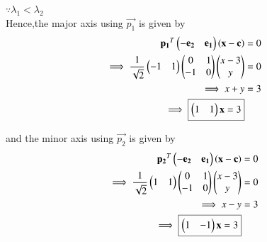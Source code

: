 \begin{enumerate}
    $\because \lambda_1<\lambda_2$ \\
    Hence,the major axis using $\vec{p_1}$ is given by
    \begin{align}
        \mathbf{p_1}^T\begin{pmatrix}-\mathbf{e_2} & \mathbf{e_1}\end{pmatrix}\left(\mathbf{x}-\mathbf{c}\right) &= 0 \\
        \implies \frac{1}{\sqrt{2}}\begin{pmatrix}-1 & 1\end{pmatrix}\begin{pmatrix}0 & 1 \\ -1 & 0\end{pmatrix}\begin{pmatrix}x-3 \\ y\end{pmatrix} &= 0 \\
        \implies x+y &= 3 \\
        \implies \boxed{\begin{pmatrix}1 & 1\end{pmatrix}\mathbf{x} =3}
    \end{align}
    
    and the minor axis using $\vec{p_2}$ is given by
    \begin{align}
        \mathbf{p_2}^T\begin{pmatrix}-\mathbf{e_2} & \mathbf{e_1}\end{pmatrix}\left(\mathbf{x}-\mathbf{c}\right) &= 0 \\
        \implies \frac{1}{\sqrt{2}}\begin{pmatrix}1 & 1\end{pmatrix}\begin{pmatrix}0 & 1 \\ -1 & 0\end{pmatrix}\begin{pmatrix}x-3 \\ y\end{pmatrix} &= 0 \\
        \implies x-y &= 3 \\
        \implies \boxed{\begin{pmatrix}1 & -1\end{pmatrix}\mathbf{x} =3}
    \end{align}
    
\end{enumerate}



